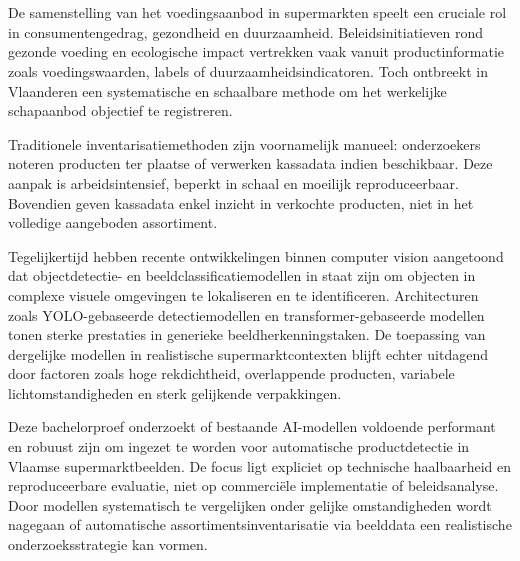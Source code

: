 
\chapter{}%
\label{ch:inleiding}

De samenstelling van het voedingsaanbod in supermarkten speelt een cruciale rol in consumentengedrag, gezondheid en duurzaamheid. Beleidsinitiatieven rond gezonde voeding en ecologische impact vertrekken vaak vanuit productinformatie zoals voedingswaarden, labels of duurzaamheidsindicatoren. Toch ontbreekt in Vlaanderen een systematische en schaalbare methode om het werkelijke schapaanbod objectief te registreren.

Traditionele inventarisatiemethoden zijn voornamelijk manueel: onderzoekers noteren producten ter plaatse of verwerken kassadata indien beschikbaar. Deze aanpak is arbeidsintensief, beperkt in schaal en moeilijk reproduceerbaar. Bovendien geven kassadata enkel inzicht in verkochte producten, niet in het volledige aangeboden assortiment.

Tegelijkertijd hebben recente ontwikkelingen binnen computer vision aangetoond dat objectdetectie- en beeldclassificatiemodellen in staat zijn om objecten in complexe visuele omgevingen te lokaliseren en te identificeren. Architecturen zoals YOLO-gebaseerde detectiemodellen en transformer-gebaseerde modellen tonen sterke prestaties in generieke beeldherkenningstaken. De toepassing van dergelijke modellen in realistische supermarktcontexten blijft echter uitdagend door factoren zoals hoge rekdichtheid, overlappende producten, variabele lichtomstandigheden en sterk gelijkende verpakkingen.

Deze bachelorproef onderzoekt of bestaande AI-modellen voldoende performant en robuust zijn om ingezet te worden voor automatische productdetectie in Vlaamse supermarktbeelden. De focus ligt expliciet op technische haalbaarheid en reproduceerbare evaluatie, niet op commerciële implementatie of beleidsanalyse. Door modellen systematisch te vergelijken onder gelijke omstandigheden wordt nagegaan of automatische assortimentsinventarisatie via beelddata een realistische onderzoeksstrategie kan vormen.

\section{}%
\label{sec:probleemstelling}

